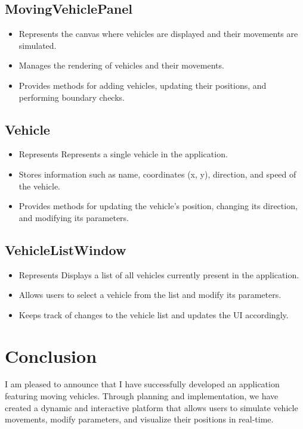 \documentclass{article}
\begin{document}
\subsection{MovingVehiclePanel}

\begin{itemize}
    \item Represents the canvas where vehicles are displayed and their movements are simulated.
    \item Manages the rendering of vehicles and their movements.
    \item Provides methods for adding vehicles, updating their positions, and performing boundary checks.
\end{itemize}


\subsection{Vehicle}

\begin{itemize}
    \item Represents Represents a single vehicle in the application.
    \item Stores information such as name, coordinates (x, y), direction, and speed of the vehicle.
    \item Provides methods for updating the vehicle's position, changing its direction, and modifying its parameters.

\end{itemize}


\subsection{VehicleListWindow}


\begin{itemize}
    \item Represents Displays a list of all vehicles currently present in the application.
    \item Allows users to select a vehicle from the list and modify its parameters.
    \item Keeps track of changes to the vehicle list and updates the UI accordingly.

\end{itemize}

\section{Conclusion}

I am pleased to announce that I have successfully developed an application featuring moving vehicles. Through planning and implementation, we have created a dynamic and interactive platform that allows users to simulate vehicle movements, modify parameters, and visualize their positions in real-time.
\end{document}
